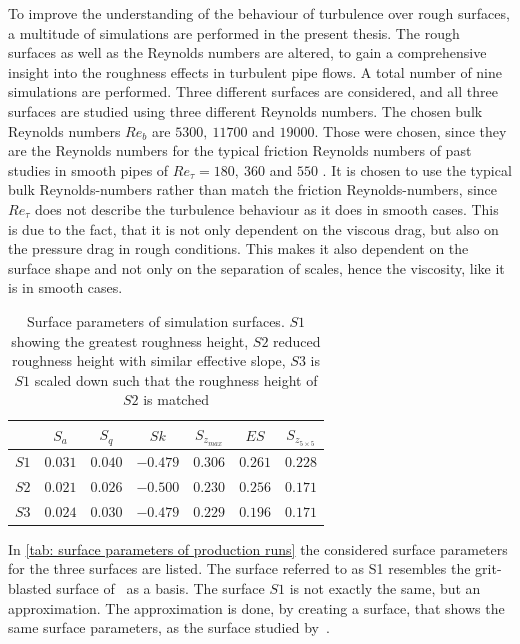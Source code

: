 To improve the understanding of the behaviour of turbulence over rough surfaces, a multitude of simulations are performed in the present thesis.
The rough surfaces as well as the Reynolds numbers are altered, to gain a comprehensive insight into the roughness effects in turbulent pipe flows.
A total number of nine simulations are performed.
Three different surfaces are considered, and all three surfaces are studied using three different Reynolds numbers.
The chosen bulk Reynolds numbers $Re_b$ are $5300,\ 11700$ and $19000$.
Those were chosen, since they are the Reynolds numbers for the typical friction Reynolds numbers of past studies in smooth pipes of $Re_\tau = 180,\ 360$ and $550$ \citep{yaoDirectNumericalSimulations2023,elkhouryDirectNumericalSimulation2013,kimProgressPipeChannel2012}. 
It is chosen to use the typical bulk Reynolds-numbers rather than match the friction Reynolds-numbers, since $Re_\tau$ does not describe the turbulence behaviour as it does in smooth cases.
This is due to the fact, that it is not only dependent on the viscous drag, but also on the pressure drag in rough conditions.
This makes it also dependent on the surface shape and not only on the separation of scales, hence the viscosity, like it is in smooth cases.

\begin{table}[h]
    \centering
    \caption[Surface parameters of simulation surfaces]{Surface parameters of simulation surfaces. $S1$ showing the greatest roughness height, $S2$ reduced roughness height with similar effective slope, $S3$ is $S1$ scaled down such that the roughness height of $S2$ is matched}
    \begin{tabular}{c c c c c c c}
        \toprule
                & $S_a$     & $S_q$     & $Sk$      & $S_{z_{max}}$ & $ES$      & $S_{z_{5 \times 5}}$  \\
        \midrule
        $S1$    & $0.031$   & $0.040$   & $-0.479$  & $0.306$       & $0.261$   & $0.228$               \\
        $S2$    & $0.021$   & $0.026$   & $-0.500$  & $0.230$       & $0.256$   & $0.171$               \\
        $S3$    & $0.024$   & $0.030$   & $-0.479$  & $0.229$       & $0.196$   & $0.171$               \\
        \bottomrule
    \end{tabular}
    \label{tab: surface parameters of production runs}
\end{table}
In \autoref{tab: surface parameters of production runs} the considered surface parameters for the three surfaces are listed.
The surface referred to as S1 resembles the grit-blasted surface of~\cite{demaioDirectNumericalSimulation2023} as a basis.
The surface $S1$ is not exactly the same, but an approximation.
The approximation is done, by creating a surface, that shows the same surface parameters, as the surface studied by~\cite{demaioDirectNumericalSimulation2023}.

